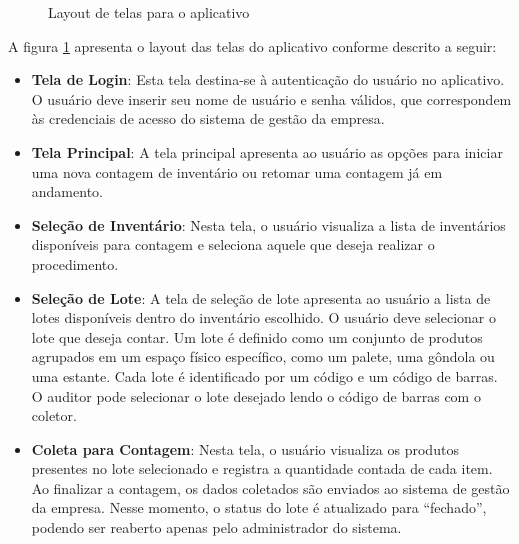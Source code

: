 \begin{figure}[!htb]
{    }
    \quad
    \caption{Layout de telas para o aplicativo}
    \label{fig:telas}
\end{figure}

A figura \ref{fig:telas} apresenta o layout das telas do aplicativo conforme descrito a seguir:

\begin{itemize}
    \item \textbf{Tela de Login}: Esta tela destina-se à autenticação do usuário no aplicativo. O usuário deve inserir seu nome de usuário e senha válidos, que correspondem às credenciais de acesso do sistema de gestão da empresa.

    \item \textbf{Tela Principal}: A tela principal apresenta ao usuário as opções para iniciar uma nova contagem de inventário ou retomar uma contagem já em andamento.

    \item \textbf{Seleção de Inventário}: Nesta tela, o usuário visualiza a lista de inventários disponíveis para contagem e seleciona aquele que deseja realizar o procedimento.

    \item \textbf{Seleção de Lote}: A tela de seleção de lote apresenta ao usuário a lista de lotes disponíveis dentro do inventário escolhido. O usuário deve selecionar o lote que deseja contar. Um lote é definido como um conjunto de produtos agrupados em um espaço físico específico, como um palete, uma gôndola ou uma estante. Cada lote é identificado por um código e um código de barras. O auditor pode selecionar o lote desejado lendo o código de barras com o coletor.

    \item \textbf{Coleta para Contagem}: Nesta tela, o usuário visualiza os produtos presentes no lote selecionado e registra a quantidade contada de cada item. Ao finalizar a contagem, os dados coletados são enviados ao sistema de gestão da empresa. Nesse momento, o status do lote é atualizado para “fechado”, podendo ser reaberto apenas pelo administrador do sistema.
\end{itemize}

